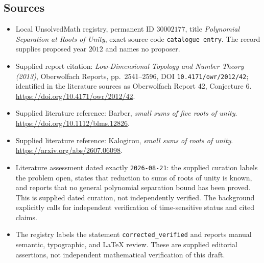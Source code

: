 \documentclass[11pt]{article}
\begin{document}
\subsection{Sources}
\begin{itemize}
\item Local UnsolvedMath registry, permanent ID \(30002177\), title \emph{Polynomial Separation at Roots of Unity}, exact source code \texttt{catalogue entry}. The record supplies proposed year \(2012\) and names no proposer.
\item Supplied report citation: \emph{Low-Dimensional Topology and Number Theory (2013)}, Oberwolfach Reports, pp.\ 2541--2596, DOI \texttt{10.4171/owr/2012/42}; identified in the literature sources as Oberwolfach Report 42, Conjecture 6. \url{https://doi.org/10.4171/owr/2012/42}.
\item Supplied literature reference: Barber, \emph{small sums of five roots of unity}. \url{https://doi.org/10.1112/blms.12826}.
\item Supplied literature reference: Kalogirou, \emph{small sums of roots of unity}. \url{https://arxiv.org/abs/2607.06098}.
\item Literature assessment dated exactly \texttt{2026-08-21}: the supplied curation labels the problem open, states that reduction to sums of roots of unity is known, and reports that no general polynomial separation bound has been proved. This is supplied dated curation, not independently verified. The background explicitly calls for independent verification of time-sensitive status and cited claims.
\item The registry labels the statement \texttt{corrected\_verified} and reports manual semantic, typographic, and LaTeX review. These are supplied editorial assertions, not independent mathematical verification of this draft.
\end{itemize}
\end{document}
